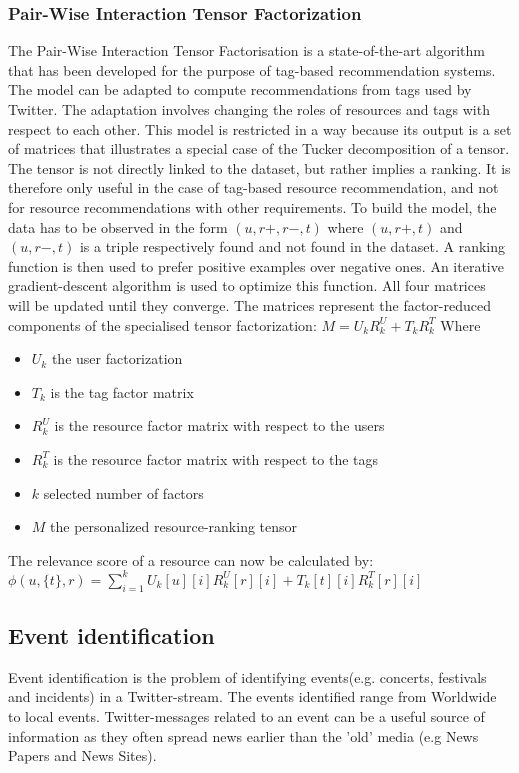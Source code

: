 \documentclass{article}
\begin{document}
\subsubsection*{Pair-Wise Interaction Tensor Factorization} 

The Pair-Wise Interaction Tensor Factorisation is a state-of-the-art algorithm that has been developed for the purpose of tag-based recommendation systems. The model can be adapted to compute recommendations from tags used by Twitter. The adaptation involves changing the roles of resources and tags with respect to each other.
This model is restricted in a way because its output is a set of matrices that illustrates a special case of the Tucker decomposition of a tensor. The tensor is not directly linked to the dataset, but rather implies a ranking. It is therefore only useful in the case of tag-based resource recommendation, and not for resource recommendations with other requirements.
To build the model, the data has to be observed in the form $(u, r+, r-, t)$ where $(u, r+, t)$ and $(u, r-, t)$ is a triple respectively
found and not found in the dataset. A ranking function is then used to prefer positive examples over negative ones. An iterative gradient-descent
algorithm is used to optimize this function. All four matrices will be updated until they converge. The matrices represent the factor-reduced components
of the specialised tensor factorization:
$M = U_k R_k^U + T_k R_k^T$
Where 
\begin{itemize}
 \item $U_k$ the user factorization
 \item $T_k$ is the tag factor matrix
 \item $R_k^U$ is the resource factor matrix with respect to the users
 \item $R_k^T$ is the resource factor matrix with respect to the tags
 \item $k$ selected number of factors
 \item $M$ the personalized resource-ranking tensor
\end{itemize}
The relevance score of a resource can now be calculated by:
$\phi (u, \{t\}, r) = \sum_{i=1}^k U_k[u][i]R_k^U[r][i] + T_k[t][i]R_k^T[r][i]$	


\subsection{Event identification}

Event identification is the problem of identifying events(e.g. concerts, festivals and incidents) in a Twitter-stream. The events identified range from Worldwide to local events. Twitter-messages related to an event can be a useful source of information as they often spread news earlier than the 'old' media (e.g News Papers and News Sites).
\end{document}
